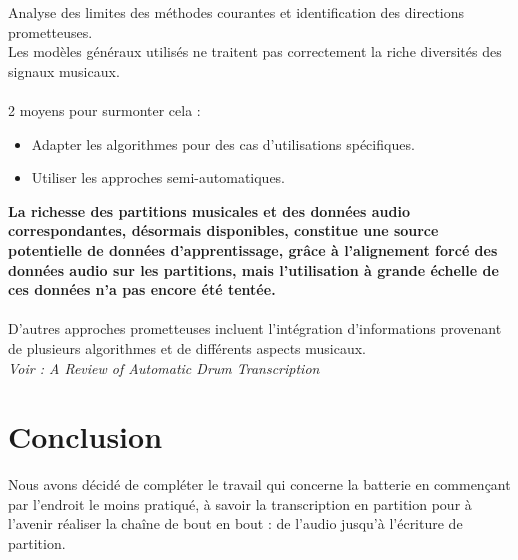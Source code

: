 Analyse des limites des méthodes courantes et identification des directions prometteuses.\\
Les modèles généraux utilisés ne traitent pas correctement la riche diversités des signaux musicaux.\\\\
2 moyens pour surmonter cela :
\begin{itemize}
	\item Adapter les algorithmes pour des cas d’utilisations spécifiques.
	\item Utiliser les approches semi-automatiques.\\
\end{itemize}
\textbf{La richesse des partitions musicales et des données audio correspondantes, désormais disponibles, constitue une source potentielle de données d'apprentissage, grâce à l'alignement forcé des données audio sur les partitions, mais l'utilisation à grande échelle de ces données n'a pas encore été tentée.}\\\\
D'autres approches prometteuses incluent l'intégration d'informations provenant de plusieurs algorithmes et de différents aspects musicaux.\\
\textit{Voir : A Review of Automatic Drum Transcription}\cite{8350302}
\section{Conclusion}
Nous avons décidé de compléter le travail qui concerne la batterie en commençant par l’endroit le moins pratiqué, à savoir la transcription en partition pour à l’avenir réaliser la chaîne de bout en bout : de l’audio jusqu’à l’écriture de partition.